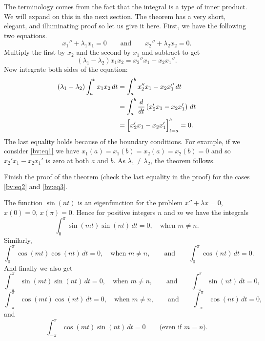 \documentclass{ximera}
\begin{document}
The terminology comes from the fact that the integral is a type of inner product.  We will expand on this in the next section.  The theorem has a very short, elegant, and illuminating proof so let us give it here. First, we have the following two equations.
\begin{equation*}
    x_1'' + \lambda_1 x_1 = 0 \qquad \text{and} \qquad x_2'' + \lambda_2 x_2 = 0.
\end{equation*}
Multiply the first by $x_2$ and the second by $x_1$ and subtract to get
\begin{equation*}
    (\lambda_1 - \lambda_2) x_1 x_2 = x_2'' x_1 - x_2 x_1'' .
\end{equation*}
Now integrate both sides of the equation:
\begin{equation*}
    \begin{split}
        (\lambda_1 - \lambda_2) \int_a^b x_1 x_2 \,dt
        & = \int_a^b x_2'' x_1 - x_2 x_1'' \,dt \\
        & = \int_a^b \frac{d}{dt} \left( x_2' x_1 - x_2 x_1' \right) \,dt \\
        & = \Bigl[ x_2' x_1 - x_2 x_1' \Bigr]_{t=a}^b = 0 .
    \end{split}
\end{equation*}
The last equality holds because of the boundary conditions.  For example, if we consider \eqref{bv:eq1} we have $x_1(a) = x_1(b) = x_2(a) = x_2(b) = 0$ and so $x_2' x_1 - x_2 x_1'$ is zero at both $a$ and $b$. As $\lambda_1 \not= \lambda_2$, the theorem follows.

\begin{exercise}%
    Finish the proof of the theorem (check the last equality in the proof) for the cases
    \eqref{bv:eq2} and \eqref{bv:eq3}.
\end{exercise}

The function $\sin (n t)$ is an eigenfunction for the problem $x''+\lambda x = 0$, $x(0) = 0$, $x(\pi) = 0$.  Hence for positive integers $n$ and $m$ we have the integrals
\begin{equation*}
    \int_{0}^\pi \sin (mt) \sin (nt) \,dt = 0 , \quad \text{when } m \not = n.
\end{equation*}
Similarly,
\begin{equation*}
    \int_{0}^\pi \cos (mt) \cos (nt) \,dt = 0 , \quad \text{when } m \not = n, \qquad \text{and} \qquad \int_{0}^\pi  \cos (nt) \,dt = 0 .
\end{equation*}
And finally we also get
\begin{equation*}
    \int_{-\pi}^\pi \sin (mt) \sin (nt) \,dt = 0 , \quad \text{when } m \not = n, \qquad \text{and} \qquad \int_{-\pi}^\pi  \sin (nt) \,dt = 0 ,
\end{equation*}
\begin{equation*}
    \int_{-\pi}^\pi \cos (mt) \cos (nt) \,dt = 0 , \quad \text{when } m \not = n, \qquad \text{and} \qquad \int_{-\pi}^\pi  \cos (nt) \,dt = 0 ,
\end{equation*}
and
\begin{equation*}
    \int_{-\pi}^\pi \cos (mt) \sin (nt) \,dt = 0 \qquad \text{(even if $m=n$).}
\end{equation*}
\end{document}
